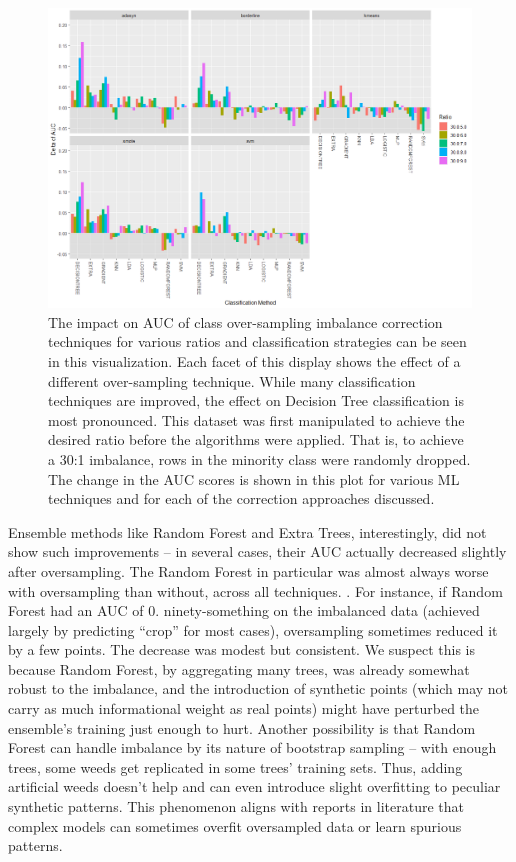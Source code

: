 \documentclass[agriengineering,article,submit,pdftex,moreauthors]{Definitions/mdpi}
\begin{document}
\begin{figure}[H]
	\centering
	\includegraphics[width=0.9\linewidth]{./figures/imbalance.png}
	\caption[Class imbalance correction techniques]{The impact on AUC of class over-sampling imbalance correction techniques for various ratios and classification strategies can be seen in this visualization. Each facet of this display shows the effect of a different over-sampling technique. While many classification techniques are improved, the effect on Decision Tree classification is most pronounced. This dataset was first manipulated to achieve the desired ratio before the algorithms were applied. That is, to achieve a 30:1 imbalance, rows in the minority class were randomly dropped. The change in the AUC scores is shown in this plot for various ML techniques and for each of the correction approaches discussed.}
	\label{fig:imbalance}
\end{figure}
 
Ensemble methods like Random Forest and Extra Trees, interestingly, did not show such improvements – in several cases, their AUC actually decreased slightly after oversampling. The Random Forest in particular was almost always worse with oversampling than without, across all techniques. . For instance, if Random Forest had an AUC of 0. ninety-something on the imbalanced data (achieved largely by predicting “crop” for most cases), oversampling sometimes reduced it by a few points. The decrease was modest but consistent. We suspect this is because Random Forest, by aggregating many trees, was already somewhat robust to the imbalance, and the introduction of synthetic points (which may not carry as much informational weight as real points) might have perturbed the ensemble’s training just enough to hurt. Another possibility is that Random Forest can handle imbalance by its nature of bootstrap sampling – with enough trees, some weeds get replicated in some trees’ training sets. Thus, adding artificial weeds doesn’t help and can even introduce slight overfitting to peculiar synthetic patterns. This phenomenon aligns with reports in literature that complex models can sometimes overfit oversampled data or learn spurious patterns.
 
\end{document}
